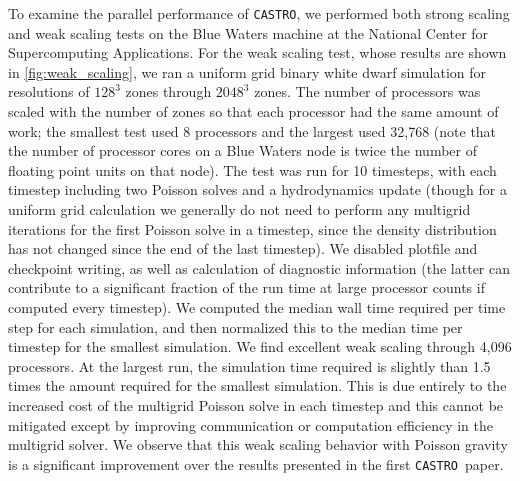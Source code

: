 \documentclass[iop]{../emulateapj}
\newcommand{\castro}{\texttt{CASTRO}}
\begin{document}
To examine the parallel performance of \castro, we performed both
strong scaling and weak scaling tests on the Blue Waters machine at
the National Center for Supercomputing Applications. For the weak
scaling test, whose results are shown in \autoref{fig:weak_scaling},
we ran a uniform grid binary white dwarf simulation for resolutions of
$128^3$ zones through $2048^3$ zones. The number of processors was
scaled with the number of zones so that each processor had the same
amount of work; the smallest test used 8 processors and the largest
used 32,768 (note that the number of processor cores on a Blue Waters
node is twice the number of floating point units on that node). The
test was run for 10 timesteps, with each timestep including two
Poisson solves and a hydrodynamics update (though for a uniform grid
calculation we generally do not need to perform any multigrid
iterations for the first Poisson solve in a timestep, since the
density distribution has not changed since the end of the last
timestep). We disabled plotfile and checkpoint writing, as well as
calculation of diagnostic information (the latter can contribute to a
significant fraction of the run time at large processor counts if
computed every timestep). We computed the median wall time required
per time step for each simulation, and then normalized this to the
median time per timestep for the smallest simulation. We find
excellent weak scaling through 4,096 processors. At the largest run,
the simulation time required is slightly than 1.5 times the amount
required for the smallest simulation.  This is due entirely to the
increased cost of the multigrid Poisson solve in each timestep and
this cannot be mitigated except by improving communication or
computation efficiency in the multigrid solver. We observe that this
weak scaling behavior with Poisson gravity is a significant
improvement over the results presented in the first \castro\ paper.
\end{document}
